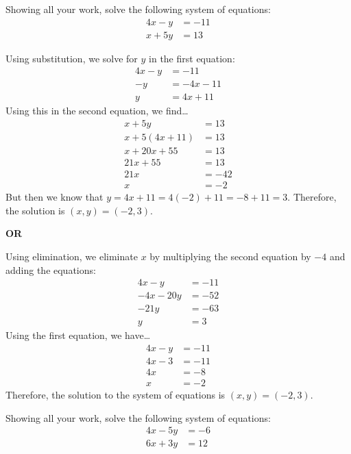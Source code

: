\documentclass[11pt,letterpaper]{article}
\begin{document}
\newpage



 Showing all your work, solve the following system of equations:
	\[
	\begin{aligned}
	4x - y&= -11 \\
	x + 5y&= 13
	\end{aligned}
	\] \pspace

\sol Using substitution, we solve for $y$ in the first equation:
	\[
	\begin{aligned}
	4x - y&= -11 \\
	-y&= -4x - 11 \\
	y&= 4x + 11
	\end{aligned}
	\] 
Using this in the second equation, we find\dots
	\[
	\begin{aligned}
	x + 5y&= 13 \\
	x + 5(4x + 11)&= 13 \\
	x + 20x + 55&= 13 \\
	21x + 55&= 13 \\
	21x&= -42 \\
	x&= -2
	\end{aligned}
	\] 
But then we know that $y= 4x + 11= 4(-2) + 11= -8 + 11= 3$. Therefore, the solution is $(x, y)= (-2, 3)$. 
	
\begin{center} {\bfseries OR} \end{center}

Using elimination, we eliminate $x$ by multiplying the second equation by $-4$ and adding the equations:
	\[
	\begin{aligned}
	4x - y&= -11 \\
	-4x - 20y&= -52 \\ \hline
	-21y&= -63 \\
	y&= 3
	\end{aligned}
	\] 
Using the first equation, we have\dots
	\[
	\begin{aligned}
	4x - y&= -11 \\
	4x - 3&= -11 \\
	4x&= -8 \\
	x&= -2
	\end{aligned}
	\] 
Therefore, the solution to the system of equations is $(x, y)= (-2, 3)$. 



\newpage



 Showing all your work, solve the following system of equations:
	\[
	\begin{aligned}
	4x - 5y&= -6 \\
	6x + 3y&= 12
	\end{aligned}
	\] \pspace
\end{document}
